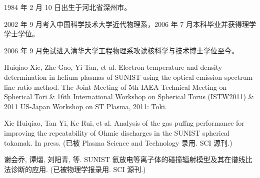 \begin{resume}


  1984 年 2 月 10 日出生于河北省深州市。

  2002 年 9 月考入中国科学技术大学近代物理系，2006 年 7 月本科毕业并获得理学学士学位。

  2006 年 9 月免试进入清华大学工程物理系攻读核科学与技术博士学位至今。


  \begin{enumerate}[{[}1{]}]
  \item Huiqiao Xie, Zhe Gao, Yi Tan, et al. Electron temperature and density determination in helium plasmas of SUNIST using the optical emission spectrum line-ratio method. The Joint Meeting of 5th IAEA Technical Meeting on Spherical Tori \& 16th International Workshop on Spherical Torus (ISTW2011) \& 2011 US-Japan Workshop on ST Plasma, 2011: Toki.
  \bigskip
  \item Xie Huiqiao, Tan Yi, Ke Rui, et al. Analysis of the gas puffng performance for improving the repeatability of Ohmic discharges in the SUNIST spherical tokamak. In press. (已被 Plasma Science and Technology 录用. SCI 源刊.)
  \item 谢会乔, 谭熠, 刘阳青, 等. SUNIST 氦放电等离子体的碰撞辐射模型及其在谱线比法诊断的应用. (已被物理学报录用. SCI 源刊.)
  \end{enumerate}
\end{resume}
